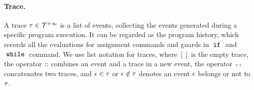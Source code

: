 \paragraph{Trace.}
%
A trace $\mathtt{\tau} \in \mathcal{T}^{+\infty}$ is a list of events, 
collecting the events generated during a specific program execution. 
It can be regarded as the program history, 
which records all the evaluations for assignment commands and guards in $\;\mathtt{if}\;$ and $\;\mathtt{while}\;$ command.
We use list notation for traces, where $[]$ is the empty trace, the operator $\traceadd$ combines an event and a trace in a new event, 
the operator ${\scriptscriptstyle ++}$ concatenates two traces, and $\mathtt{\epsilon} \in \mathtt{\tau}$ or $\mathtt{\epsilon} \notin \mathtt{\tau}$ denotes an event $\mathtt{\epsilon}$ belongs or not to $\mathtt{\tau}$.

